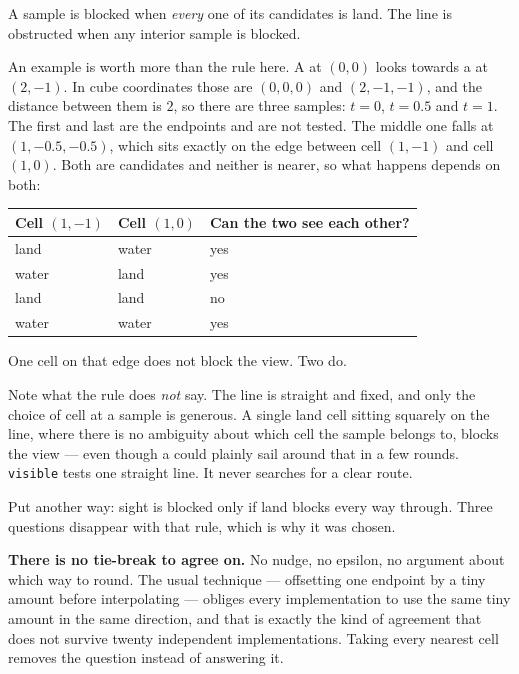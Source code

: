 \documentclass{article}
\begin{document}
\begin{center}
A sample is blocked when \emph{every} one of its candidates is land. The line is obstructed when
any interior sample is blocked.
\end{center}

An example is worth more than the rule here. A \ship{} at $(0,0)$ looks towards a \ship{} at
$(2,-1)$. In cube coordinates those are $(0,0,0)$ and $(2,-1,-1)$, and the distance between them is
$2$, so there are three samples: $t = 0$, $t = 0.5$ and $t = 1$. The first and last are the
endpoints and are not tested. The middle one falls at $(1, -0.5, -0.5)$, which sits exactly on the
edge between cell $(1,-1)$ and cell $(1,0)$. Both are candidates and neither is nearer, so what
happens depends on both:

\begin{center}
\begin{tabular}{|l|l|l|}
 \hline
 {\bf Cell $(1,-1)$} & {\bf Cell $(1,0)$} & {\bf Can the two \ships{} see each other?} \\
 \hline\hline
 land & water & yes \\
 \hline
 water & land & yes \\
 \hline
 land & land & no \\
 \hline
 water & water & yes \\
 \hline
\end{tabular}
\end{center}

One \island{} cell on that edge does not block the view. Two do.

Note what the rule does \emph{not} say. The line is straight and fixed, and only the choice of cell
at a sample is generous. A single land cell sitting squarely on the line, where there is no
ambiguity about which cell the sample belongs to, blocks the view --- even though a \ship{} could
plainly sail around that \island{} in a few rounds. \texttt{visible} tests one straight line. It
never searches for a clear route.

Put another way: sight is blocked only if land blocks every way through. Three questions disappear
with that rule, which is why it was chosen.

\textbf{There is no tie-break to agree on.} No nudge, no epsilon, no argument about which way to
round. The usual technique --- offsetting one endpoint by a tiny amount before interpolating ---
obliges every implementation to use the same tiny amount in the same direction, and that is exactly
the kind of agreement that does not survive twenty independent implementations. Taking every
nearest cell removes the question instead of answering it.
\end{document}
